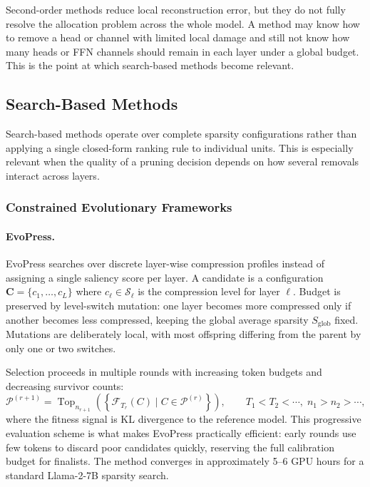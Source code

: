 Second-order methods reduce local reconstruction error, but they do not fully resolve the allocation problem across the whole model. A method may know how to remove a head or channel with limited local damage and still not know how many heads or FFN channels should remain in each layer under a global budget. This is the point at which search-based methods become relevant.

\subsection{Search-Based Methods}

Search-based methods operate over complete sparsity configurations rather than applying a single closed-form ranking rule to individual units. This is especially relevant when the quality of a pruning decision depends on how several removals interact across layers.

\subsubsection{Constrained Evolutionary Frameworks}
\label{subsec:evopress_pruning}

\paragraph{EvoPress.}
EvoPress \cite{evopress2024} searches over discrete layer-wise compression profiles instead of assigning a single saliency score per layer. A candidate is a configuration $\mathbf{C} = \{c_1,\dots,c_L\}$ where $c_\ell \in \mathcal{S}_\ell$ is the compression level for layer $\ell$. Budget is preserved by level-switch mutation: one layer becomes more compressed only if another becomes less compressed, keeping the global average sparsity $S_{\text{glob}}$ fixed. Mutations are deliberately local, with most offspring differing from the parent by only one or two switches.

Selection proceeds in multiple rounds with increasing token budgets and decreasing survivor counts:
\begin{equation}
	\mathcal{P}^{(r+1)} =
	\operatorname{Top}_{n_{r+1}}
	\left(
	\left\{
	\mathcal{F}_{T_r}(C) \mid C \in \mathcal{P}^{(r)}
	\right\}
	\right),
	\qquad
	T_1<T_2<\cdots,\;
	n_1>n_2>\cdots,
\end{equation}
where the fitness signal is KL divergence to the reference model. This progressive evaluation scheme is what makes EvoPress practically efficient: early rounds use few tokens to discard poor candidates quickly, reserving the full calibration budget for finalists. The method converges in approximately 5--6 GPU hours for a standard Llama-2-7B sparsity search.

